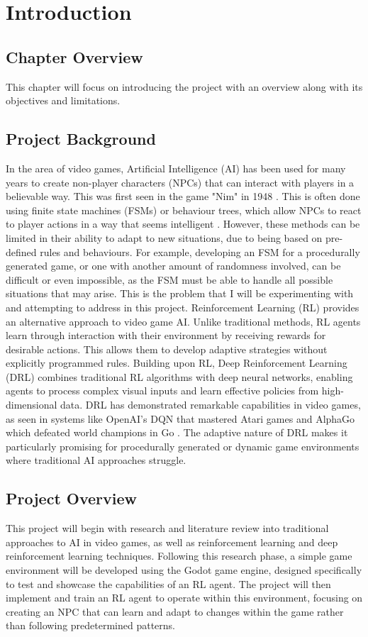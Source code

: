 \chapter{Introduction}

\section{Chapter Overview}
This chapter will focus on introducing the project with an overview along with its objectives and limitations.

\section{Project Background}
In the area of video games, Artificial Intelligence (AI) has been used for many years to create non-player characters (NPCs) that can interact with players in a believable way. This was first seen in the game "Nim" in 1948 \cite{wiki_ai_games}. 
This is often done using finite state machines (FSMs) or behaviour trees, which allow NPCs to react to player actions in a way that seems intelligent \cite{simulacrum}.
However, these methods can be limited in their ability to adapt to new situations, due to being based on pre-defined rules and behaviours. 
For example, developing an FSM for a procedurally generated game, or one with another amount of randomness involved, can be difficult or even impossible, as the FSM must be able to handle all possible situations that may arise.
This is the problem that I will be experimenting with and attempting to address in this project.
Reinforcement Learning (RL) provides an alternative approach to video game AI. 
Unlike traditional methods, RL agents learn through interaction with their environment by receiving rewards for desirable actions. 
This allows them to develop adaptive strategies without explicitly programmed rules.
Building upon RL, Deep Reinforcement Learning (DRL) combines traditional RL algorithms with deep neural networks, enabling agents to process complex visual inputs and learn effective policies from high-dimensional data. 
DRL has demonstrated remarkable capabilities in video games, as seen in systems like OpenAI's DQN that mastered Atari games \cite{keras_dqn_breakout} and AlphaGo which defeated world champions in Go \cite{deepmind_alphago}.
The adaptive nature of DRL makes it particularly promising for procedurally generated or dynamic game environments where traditional AI approaches struggle.

\section{Project Overview}
This project will begin with research and literature review into traditional approaches to AI in video games, as well as reinforcement learning and deep reinforcement learning techniques. 
Following this research phase, a simple game environment will be developed using the Godot game engine, designed specifically to test and showcase the capabilities of an RL agent. 
The project will then implement and train an RL agent to operate within this environment, focusing on creating an NPC that can learn and adapt to changes within the game rather than following predetermined patterns. 

